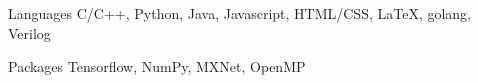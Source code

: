 

\begin{cvskills}

  \cvskill
    {Languages} %
    {C/C++, Python, Java, Javascript, HTML/CSS, LaTeX, golang, Verilog} %

  \cvskill
    {Packages} %
    {Tensorflow, NumPy, MXNet, OpenMP} %

%
\end{cvskills}

